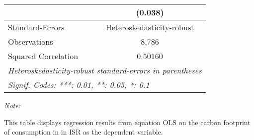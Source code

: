 \begin{table}[htbp!]
\begin{adjustbox}{width = 1\textwidth, max height = 0.95\textheight, center}
\begin{threeparttable}[b]
\begin{tabular}{lc}
                                & (0.038)\\   
            \midrule 
            Standard-Errors     & Heteroskedasticity-robust \\   
            Observations        & 8,786\\  
            Squared Correlation & 0.50160\\  
            \midrule \midrule
            \multicolumn{2}{l}{\emph{Heteroskedasticity-robust standard-errors in parentheses}}\\
            \multicolumn{2}{l}{\emph{Signif. Codes: ***: 0.01, **: 0.05, *: 0.1}}\\
         \end{tabular}
         
         \begin{tablenotes}\item \medskip \textit{Note:}
            \item This table displays regression results from equation OLS on the carbon footprint of consumption in  in ISR as the dependent variable.  
         \end{tablenotes}
      \end{threeparttable}
   \end{adjustbox}
\end{table}


